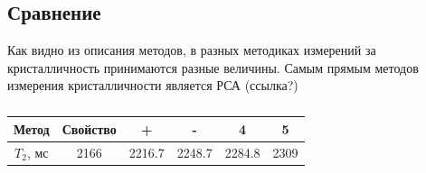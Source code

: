 \subsection{Сравнение}


Как видно из описания методов, в разных методиках измерений за кристалличность принимаются разные величины. Самым прямым методов измерения кристалличности является РСА (ссылка?)

\begin{table}[h]
\begin{tabular}{|c|c|c|c|c|c|}
\hline
Метод     & Свойство & +      & -      & 4      & 5    \\ \hline
$T_2$, мс & 2166     & 2216.7 & 2248.7 & 2284.8 & 2309 \\ \hline
\end{tabular}
\caption{}
\label{undefined}
\end{table}

